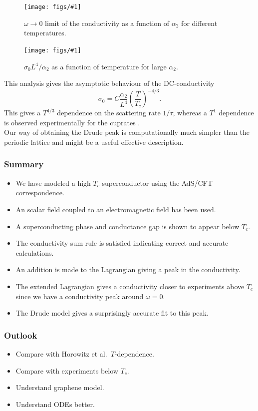\documentclass{beamer}
\newcommand{\fig}[2]{
\begin{figure}
\centering
\texttt{[image: figs/\#1]}
\caption{#2}
\end{figure}
}
\begin{document}
\begin{frame}
\fig{drudeVarMT}{$\omega\rightarrow0$ limit of the conductivity as a function of $\alpha_2$ for different temperatures.\label{f:drudeVarT}}
\end{frame}

\begin{frame}
\fig{drudeTdep_1e4}{$\sigma_0L^4/\alpha_2$ as a function of temperature for large $\alpha_2$.\label{f:Cdep}}
\end{frame}

\begin{frame}
This analysis gives the asymptotic behaviour of the DC-conductivity
\begin{equation}
 \sigma_0=C\frac{\alpha_2}{L^4}\left(\frac{T}{T_c}\right)^{-4/3}.
\end{equation}
This gives a $T^{4/3}$ dependence on the scattering rate $1/\tau$, whereas a $T^1$ dependence is observed experimentally for the cuprates \cite{drudeFit}.\\

Our way of obtaining the Drude peak is computationally much simpler than the periodic lattice and might be a useful effective description.\\
\end{frame}

\begin{frame}
\frametitle{Summary}
\begin{itemize}
\item We have modeled a high $T_c$ superconductor using the AdS/CFT correspondence.
\item An scalar field coupled to an electromagnetic field has been used.
\item A superconducting phase and conductance gap is shown to appear below $T_c$.
\item The conductivity sum rule is satisfied indicating correct and accurate calculations.
\item An addition is made to the Lagrangian giving a peak in the conductivity.
\item The extended Lagrangian gives a conductivity closer to experiments above $T_c$ since we have a conductivity peak around $\omega=0$.
\item The Drude model gives a surprisingly accurate fit to this peak.
\end{itemize}
\end{frame}

\begin{frame}
\frametitle{Outlook}
\begin{itemize}
\item Compare with Horowitz et al.~$T$-dependence.
\item Compare with experiments below $T_c$.
\item Understand graphene model.
\item Understand ODEs better.
\end{itemize}
\end{frame}
\end{document}
